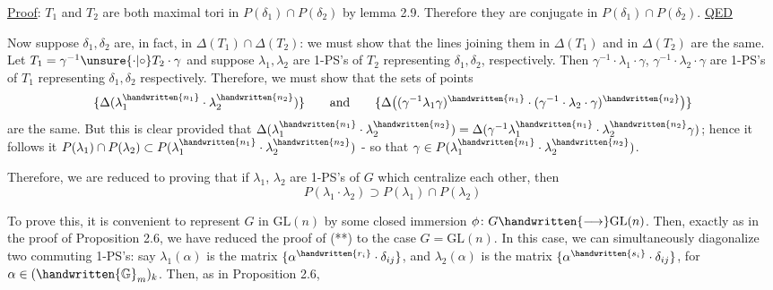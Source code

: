 
\uline{Proof}: $T_1$ and $T_2$ are both maximal tori in $P(\delta_1)\cap P(\delta_2)$ by lemma 2.9. Therefore they are conjugate in $P(\delta_1)\cap P(\delta_2)$. \hfill\uline{QED}

Now suppose $\delta_1,\delta_2$ are, in fact, in $\Delta(T_1)\cap\Delta(T_2)$: we must show that the lines joining them in $\Delta(T_1)$ and in $\Delta(T_2)$ are the same. Let $T_1=\gamma^{-1}\unsure{\cdot|\circ} T_2\cdot\gamma$ and suppose $\lambda_1,\lambda_2$ are 1-PS's of $T_2$ representing $\delta_1,\delta_2$, respectively. Then $\gamma^{-1}\cdot\lambda_1\cdot\gamma$, $\gamma^{-1}\cdot\lambda_2\cdot\gamma$ are 1-PS's of $T_1$ representing $\delta_1,\delta_2$ respectively. Therefore, we must show that the sets of points
\[
 \{\Delta(\lambda_1^{\handwritten{n_1}}\cdot\lambda_2^{\handwritten{n_2}})\}
 \qquad\text{and}\qquad
 \{\Delta\bigl((\gamma^{-1}\lambda_1\gamma)^{\handwritten{n_1}}\cdot(\gamma^{-1}\cdot\lambda_2\cdot\gamma)^{\handwritten{n_2}}\bigr)\}
\]
are the same. But this is clear provided that $\Delta(\lambda_1^{\handwritten{n_1}}\cdot\lambda_2^{\handwritten{n_2}})=\Delta(\gamma^{-1}\lambda_1^{\handwritten{n_1}}\cdot\lambda_2^{\handwritten{n_2}}\gamma)$; hence it follows it $P(\lambda_1)\cap P(\lambda_2)\subset P(\lambda_1^{\handwritten{n_1}}\cdot\lambda_2^{\handwritten{n_2}})$ - so that $\gamma\in P(\lambda_1^{\handwritten{n_1}}\cdot\lambda_2^{\handwritten{n_2}})$.

Therefore, we are reduced to proving that if $\lambda_1$, $\lambda_2$ are 1-PS's of $G$ which centralize each other, then
\begingroup\makeatletter\tagsleft@true\makeatother
\[
 P(\lambda_1\cdot\lambda_2)\supset P(\lambda_1)\cap P(\lambda_2) \tag*{(**)}
\]
\endgroup

To prove this, it is convenient to represent $G$ in $\mathrm{GL}(n)$ by some closed immersion $\phi\colon G\handwritten{\longrightarrow}\mathrm{GL}(n)$. Then, exactly as in the proof of Proposition 2.6, we have reduced the proof of (**) to the case $G=\mathrm{GL}(n)$. In this case, we can simultaneously diagonalize two commuting 1-PS's: say $\lambda_1(\alpha)$ is the matrix $\{\alpha^{\handwritten{r_i}}\cdot\delta_{ij}\}$, and $\lambda_2(\alpha)$ is the matrix $\{\alpha^{\handwritten{s_i}}\cdot\delta_{ij}\}$, for $\alpha\in(\handwritten{\mathbb{G}}_m)_k$. Then, as in Proposition 2.6,
